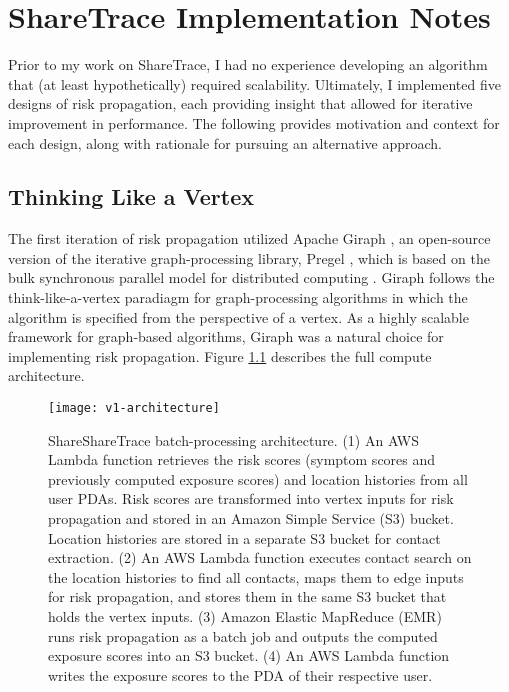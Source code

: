 \chapter{ShareTrace Implementation Notes}

\par Prior to my work on ShareTrace, I had no experience developing an algorithm that (at least hypothetically) required scalability. Ultimately, I implemented five designs of risk propagation, each providing insight that allowed for iterative improvement in performance. The following provides motivation and context for each design, along with rationale for pursuing an alternative approach.

\section{Thinking Like a Vertex}\label{sec:giraph}

\par The first iteration of risk propagation utilized Apache Giraph \cite{Giraph2020}, an open-source version of the iterative graph-processing library, Pregel \cite{Malewicz2010}, which is based on the bulk synchronous parallel model for distributed computing \cite{Valiant1990}. Giraph follows the think-like-a-vertex paradiagm for graph-processing algorithms in which the algorithm is specified from the perspective of a vertex. As a highly scalable framework for graph-based algorithms, Giraph was a natural choice for implementing risk propagation. Figure \ref{fig:v1-architecture} describes the full compute architecture. 

\begin{figure}[htbp]
	\centering
	\texttt{[image: v1-architecture]}
	\caption[ShareTrace batch-processing architecture]{ShareShareTrace batch-processing architecture. 
		(1) An AWS Lambda function retrieves the risk scores (symptom scores and previously computed exposure scores) and location histories from all user PDAs. Risk scores are transformed into vertex inputs for risk propagation and stored in an Amazon Simple Service (S3) bucket. Location histories are stored in a separate S3 bucket for contact extraction. (2) An AWS Lambda function executes contact search on the location histories to find all contacts, maps them to edge inputs for risk propagation, and stores them in the same S3 bucket that holds the vertex inputs. (3) Amazon Elastic MapReduce (EMR) runs risk propagation as a batch job and outputs the computed exposure scores into an S3 bucket. (4) An AWS Lambda function writes the exposure scores to the PDA of their respective user.}
	\label{fig:v1-architecture}
\end{figure}

